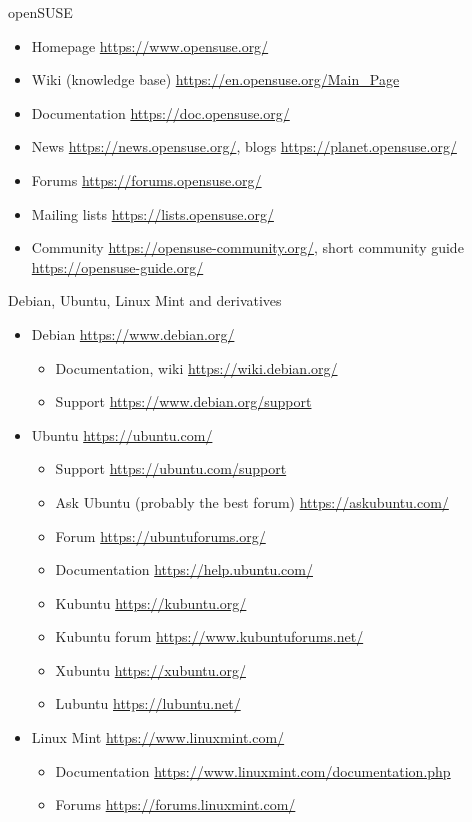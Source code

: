 \documentclass[compress, ucs, xelatex, 11pt, xcolor=svgnames, aspectratio=169,
	hyperref={
		bookmarks=true,
		unicode=true,
		colorlinks=true,
		pdftitle={Linux, command line and MetaCentrum},
		plainpages=false,
		pdfauthor={Vojtech Zeisek},
		pdfsubject={Course about use of Linux command line, writing shell scripts and using MetaCentrum of CESNET},
		pdfcreator={XeLaTeX},
		pdfkeywords={Linux, GNU, BASH, shell, command line, MetaCentrum},
		linkcolor=DarkRed, %
		anchorcolor=DarkBlue, %
		citecolor=Indigo, %
		filecolor=NavyBlue, %
		menucolor=DarkMagenta, %
		urlcolor=DarkBlue, %
		pdftex},
	url={hyphens, lowtilde} %
	]{beamer}
\begin{document}
\begin{frame}{openSUSE}
	\begin{itemize}
		\item Homepage \url{https://www.opensuse.org/}
		\item Wiki (knowledge base) \url{https://en.opensuse.org/Main_Page}
		\item Documentation \url{https://doc.opensuse.org/}
		\item News \url{https://news.opensuse.org/}, blogs \url{https://planet.opensuse.org/}
		\item Forums \url{https://forums.opensuse.org/}
		\item Mailing lists \url{https://lists.opensuse.org/}
		\item Community \url{https://opensuse-community.org/}, short community guide \url{https://opensuse-guide.org/}
	\end{itemize}
\end{frame}

\begin{frame}{Debian, Ubuntu, Linux Mint and derivatives}
	\begin{itemize}
		\item Debian \url{https://www.debian.org/}
		\begin{itemize}
			\item Documentation, wiki \url{https://wiki.debian.org/}
			\item Support \url{https://www.debian.org/support}
		\end{itemize}
		\item Ubuntu \url{https://ubuntu.com/}
		\begin{itemize}
			\item Support \url{https://ubuntu.com/support}
			\item Ask Ubuntu (probably the best forum) \url{https://askubuntu.com/}
			\item Forum \url{https://ubuntuforums.org/}
			\item Documentation \url{https://help.ubuntu.com/}
			\item Kubuntu \url{https://kubuntu.org/}
			\item Kubuntu forum \url{https://www.kubuntuforums.net/}
			\item Xubuntu \url{https://xubuntu.org/}
			\item Lubuntu \url{https://lubuntu.net/}
		\end{itemize}
		\item Linux Mint \url{https://www.linuxmint.com/}
		\begin{itemize}
			\item Documentation \url{https://www.linuxmint.com/documentation.php}
			\item Forums \url{https://forums.linuxmint.com/}
		\end{itemize}
	\end{itemize}
\end{frame}
\end{document}
